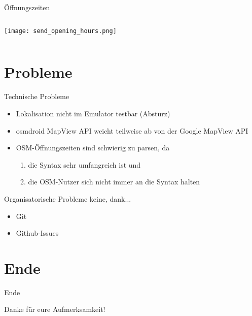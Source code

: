 \documentclass[hyperref]{beamer}
\begin{document}
\begin{frame}{\"Offnungszeiten}
	\begin{columns}
		\column{5.1cm}	    
	    \column{5cm}
    	\texttt{[image: send\_opening\_hours.png]}
    \end{columns}
\end{frame}




\section{Probleme}


\begin{frame}{Technische Probleme}
	\begin{itemize}
		\item Lokalisation nicht im Emulator testbar (Absturz)
        \item osmdroid MapView API weicht teilweise ab von der Google MapView API
		\item OSM-Öffnungszeiten sind schwierig zu parsen, da
		\begin{enumerate}
		  \item die Syntax sehr umfangreich ist und
		  \item die OSM-Nutzer sich nicht immer an die Syntax halten
		\end{enumerate}
	\end{itemize}
\end{frame}


\begin{frame}{Organisatorische Probleme}
	keine, dank...
	\begin{itemize}
		\item Git
		\item Github-Issues
	\end{itemize}
\end{frame}

\section{Ende}
\begin{frame}{Ende}
	\begin{center}
		Danke für eure Aufmerksamkeit!
	\end{center}
\end{frame}
\end{document}
